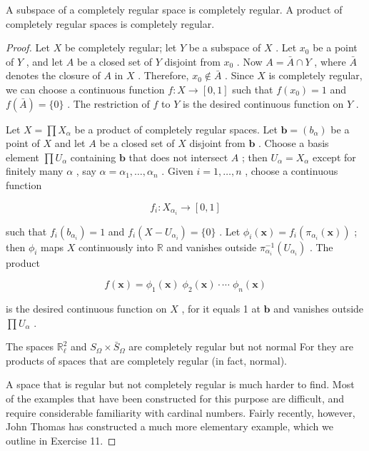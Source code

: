 \begin{theorem}
	A subspace of a completely regular space is completely regular. A product of completely regular spaces is completely regular.
\end{theorem}
\begin{proof}
	Let \(X\) be completely regular; let \(Y\) be a subspace of \(X\) . Let \({x}_{0}\) be a point of \(Y\) , and let \(A\) be a closed set of \(Y\) disjoint from \({x}_{0}\) . Now \(A = \bar{A} \cap  Y\) , where \(\bar{A}\) denotes the closure of \(A\) in \(X\) . Therefore, \({x}_{0} \notin  \bar{A}\) . Since \(X\) is completely regular, we can choose a continuous function \(f : X \rightarrow  \left\lbrack  {0,1}\right\rbrack\) such that \(f\left( {x}_{0}\right)  = 1\) and \(f\left( \bar{A}\right)  = \{ 0\}\) . The restriction of \(f\) to \(Y\) is the desired continuous function on \(Y\) .

Let \(X = \prod {X}_{\alpha }\) be a product of completely regular spaces. Let \(\mathbf{b} = \left( {b}_{\alpha }\right)\) be a point of \(X\) and let \(A\) be a closed set of \(X\) disjoint from \(\mathbf{b}\) . Choose a basis element \(\prod {U}_{\alpha }\) containing \(\mathbf{b}\) that does not intersect \(A\) ; then \({U}_{\alpha } = {X}_{\alpha }\) except for finitely many \(\alpha\) , say \(\alpha  = {\alpha }_{1},\ldots ,{\alpha }_{n}\) . Given \(i = 1,\ldots ,n\) , choose a continuous function

\[
{f}_{i} : {X}_{{\alpha }_{i}} \rightarrow  \left\lbrack  {0,1}\right\rbrack
\]

such that \({f}_{i}\left( {b}_{{\alpha }_{i}}\right)  = 1\) and \({f}_{i}\left( {X - {U}_{{\alpha }_{i}}}\right)  = \{ 0\}\) . Let \({\phi }_{i}\left( \mathbf{x}\right)  = {f}_{i}\left( {{\pi }_{{\alpha }_{i}}\left( \mathbf{x}\right) }\right)\) ; then \({\phi }_{i}\) maps \(X\) continuously into \(\mathbb{R}\) and  vanishes outside \({\pi }_{{\alpha }_{i}}^{-1}\left( {U}_{{\alpha }_{i}}\right)\) . The product

\[
f\left( \mathbf{x}\right)  = {\phi }_{1}\left( \mathbf{x}\right) \;{\phi }_{2}\left( \mathbf{x}\right)  \cdot  \cdots \;{\phi }_{n}\left( \mathbf{x}\right)
\]

is the desired continuous function on \(X\) , for it equals 1 at \(\mathbf{b}\) and vanishes outside \(\prod {U}_{\alpha }\) .

\begin{centeredblock}
\begin{example}
	The spaces \({\mathbb{R}}_{\ell }^{2}\) and \({S}_{\Omega } \times  {\bar{S}}_{\Omega }\) are completely regular but not normal For they are products of spaces that are completely regular (in fact, normal).
\end{example}
\end{centeredblock}

A space that is regular but not completely regular is much harder to find. Most of the examples that have been constructed for this purpose are difficult, and require considerable familiarity with cardinal numbers. Fairly recently, however, John Thomas 		\cite{Thomas1969} has constructed a much more elementary example, which we outline in Exercise 11.

\end{proof}

